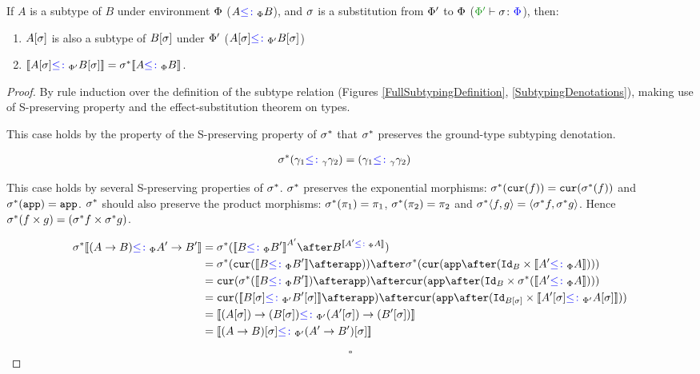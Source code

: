 \documentclass{Report}
\begin{document}
\begin{framed}
    \begin{theorem}\label{EffectSubstitutionOnSubtyping}
        If $A$ is a subtype of $B$ under environment $\P$ ($A \subtypep B$), and $\si$ is a substitution from $\P'$ to $\P$ ($\typerelation{\P'}{\si}{\P}$), then:
        \begin{enumerate}[label=\roman*.]
            \item $A\ssi$ is also a subtype of $B\ssi$ under $\P'$ ($A\ssi\subtypepp B\ssi$)
            \item $\deno{A\ssi\subtypepp B\ssi} = \si\star\deno{A\subtypep B}$.
        \end{enumerate}
    \end{theorem}


\begin{proof}
    By rule induction over the definition of the subtype relation (Figures \ref{FullSubtypingDefinition}, \ref{SubtypingDenotations}), making use of S-preserving property and the effect-substitution theorem on types.


\case{\sground}
This case holds by the property of the S-preserving property of $\si\star$ that $\si\star$ preserves the ground-type subtyping denotation.

\begin{align*}
    \si\star(\g_1\subtypeg\g_2) &= (\g_1\subtypeg\g_2)
\end{align*}



\case{\sfun}

This case holds by several S-preserving properties of $\si\star$. $\si\star$ preserves the exponential morphisms: $\si\star(\cur{f}) = \cur{\si\star(f)}$ and $\si\star(\app) = \app$. $\si\star$ should also preserve the product morphisms: $\si\star(\p) = \p$, $\si\star(\pp) = \pp$ and $\si\star\pr{f}{g} = \pr{\si\star f}{\si\star g}$. Hence $\si\star(f \times g) = (\si\star f \times \si\star g)$.

\begin{align*}
    \si\star\deno{(\ab)\subtypep\fntype{A'}{B'}} &= \si\star(\deno{B\subtypep B'}^{A'}\after B^{\deno{A'\subtypep A}})\\
    &= \si\star(\cur{\deno{B\subtypep B'}\after\app})\after\si\star(\cur{\app\after(\Id{B}\times\deno{A'\subtypep A})})\\
    & = \cur{\si\star(\deno{B\subtypep B'})\after\app}\after\cur{\app\after(\Id{B}\times\si\star(\deno{A'\subtypep A}))}\\
    & = \cur{\deno{B\ssi\subtypepp B'\ssi}\after\app}\after\cur{\app\after(\Id{B\ssi}\times\deno{A'\ssi\subtypepp A\ssi})}\\
    &= \deno{\fntype{(A\ssi)}{(B\ssi)}\subtypepp\fntype{(A'\ssi)}{(B'\ssi)}}\\
    &= \deno{(\ab)\ssi\subtypepp(\fntype{A'}{B'})\ssi}
\end{align*}


$$\square$$
\end{proof}
\end{framed}
\end{document}
